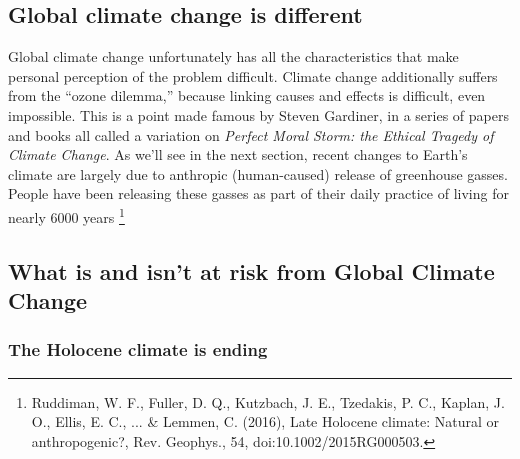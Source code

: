 \subsection{Global climate change is different}\label{GCC_diff}
Global climate change unfortunately has all the characteristics that make personal perception of the problem difficult. Climate change additionally suffers from the ``ozone dilemma,'' because linking causes and effects is difficult, even impossible. This is a point made famous by Steven Gardiner, in a series of papers and books all called a variation on \emph{Perfect Moral Storm: the Ethical Tragedy of Climate Change}. As we'll see in the next section, recent changes to Earth's climate are largely due to anthropic (human-caused) release of greenhouse gasses. People have been releasing these gasses as part of their daily practice of living for nearly 6000 years \footnote{Ruddiman, W. F., Fuller, D. Q., Kutzbach, J. E., Tzedakis, P. C., Kaplan, J. O., Ellis, E. C., ... \& Lemmen, C. (2016), Late
Holocene climate: Natural or anthropogenic?, Rev. Geophys., 54, doi:10.1002/2015RG000503.}


\subsection{What is and isn't at risk from Global Climate Change}\label{Risk}
\subsubsection{The Holocene climate is ending}
